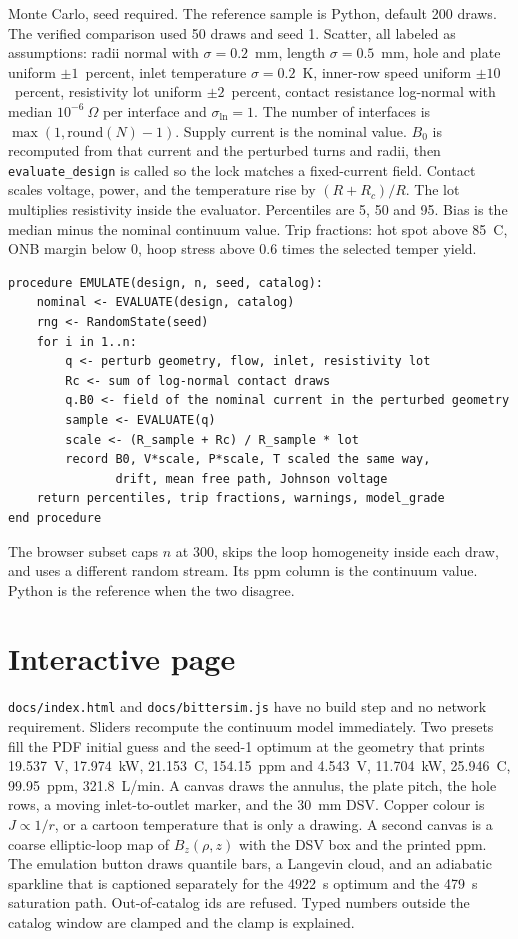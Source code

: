 \documentclass[11pt]{article}
\begin{document}
Monte Carlo, seed required.
The reference sample is Python, default 200 draws.
The verified comparison used 50 draws and seed 1.
Scatter, all labeled as assumptions: radii normal with $\sigma=0.2$~mm, length $\sigma=0.5$~mm, hole and plate uniform $\pm 1$~percent, inlet temperature $\sigma=0.2$~K, inner-row speed uniform $\pm 10$~percent, resistivity lot uniform $\pm 2$~percent, contact resistance log-normal with median $10^{-6}~\Omega$ per interface and $\sigma_{\ln}=1$.
The number of interfaces is $\max(1,\mathrm{round}(N)-1)$.
Supply current is the nominal value.
$B_0$ is recomputed from that current and the perturbed turns and radii, then \texttt{evaluate\_design} is called so the lock matches a fixed-current field.
Contact scales voltage, power, and the temperature rise by $(R+R_c)/R$.
The lot multiplies resistivity inside the evaluator.
Percentiles are 5, 50 and 95.
Bias is the median minus the nominal continuum value.
Trip fractions: hot spot above 85~C, ONB margin below 0, hoop stress above 0.6 times the selected temper yield.

\begin{verbatim}
procedure EMULATE(design, n, seed, catalog):
    nominal <- EVALUATE(design, catalog)
    rng <- RandomState(seed)
    for i in 1..n:
        q <- perturb geometry, flow, inlet, resistivity lot
        Rc <- sum of log-normal contact draws
        q.B0 <- field of the nominal current in the perturbed geometry
        sample <- EVALUATE(q)
        scale <- (R_sample + Rc) / R_sample * lot
        record B0, V*scale, P*scale, T scaled the same way,
               drift, mean free path, Johnson voltage
    return percentiles, trip fractions, warnings, model_grade
end procedure
\end{verbatim}

The browser subset caps $n$ at 300, skips the loop homogeneity inside each draw, and uses a different random stream.
Its ppm column is the continuum value.
Python is the reference when the two disagree.

\section{Interactive page}

\texttt{docs/index.html} and \texttt{docs/bittersim.js} have no build step and no network requirement.
Sliders recompute the continuum model immediately.
Two presets fill the PDF initial guess and the seed-1 optimum at the geometry that prints 19.537~V, 17.974~kW, 21.153~C, 154.15~ppm and 4.543~V, 11.704~kW, 25.946~C, 99.95~ppm, 321.8~L/min.
A canvas draws the annulus, the plate pitch, the hole rows, a moving inlet-to-outlet marker, and the 30~mm DSV.
Copper colour is $J\propto 1/r$, or a cartoon temperature that is only a drawing.
A second canvas is a coarse elliptic-loop map of $B_z(\rho,z)$ with the DSV box and the printed ppm.
The emulation button draws quantile bars, a Langevin cloud, and an adiabatic sparkline that is captioned separately for the 4922~s optimum and the 479~s saturation path.
Out-of-catalog ids are refused.
Typed numbers outside the catalog window are clamped and the clamp is explained.
\end{document}
